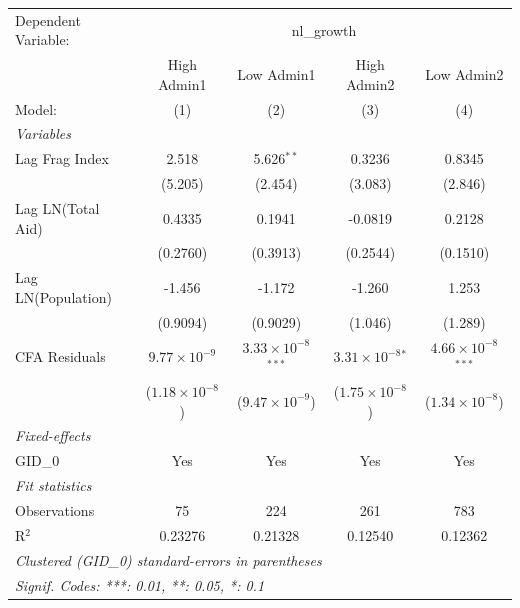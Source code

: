
\begingroup
\centering
\begin{tabular}{lcccc}
   \tabularnewline \midrule \midrule
   Dependent Variable: & \multicolumn{4}{c}{nl\_growth}\\
                      & High Admin1             & Low Admin1                    & High Admin2                 & Low Admin2 \\   
   Model:             & (1)                     & (2)                           & (3)                         & (4)\\  
   \midrule
   \emph{Variables}\\
   Lag Frag Index     & 2.518                   & 5.626$^{**}$                  & 0.3236                      & 0.8345\\   
                      & (5.205)                 & (2.454)                       & (3.083)                     & (2.846)\\   
   Lag LN(Total Aid)  & 0.4335                  & 0.1941                        & -0.0819                     & 0.2128\\   
                      & (0.2760)                & (0.3913)                      & (0.2544)                    & (0.1510)\\   
   Lag LN(Population) & -1.456                  & -1.172                        & -1.260                      & 1.253\\   
                      & (0.9094)                & (0.9029)                      & (1.046)                     & (1.289)\\   
   CFA Residuals      & $9.77\times 10^{-9}$    & $3.33\times 10^{-8}$$^{***}$  & $3.31\times 10^{-8}$$^{*}$  & $4.66\times 10^{-8}$$^{***}$\\    
                      & ($1.18\times 10^{-8}$)  & ($9.47\times 10^{-9}$)        & ($1.75\times 10^{-8}$)      & ($1.34\times 10^{-8}$)\\    
   \midrule
   \emph{Fixed-effects}\\
   GID\_0             & Yes                     & Yes                           & Yes                         & Yes\\  
   \midrule
   \emph{Fit statistics}\\
   Observations       & 75                      & 224                           & 261                         & 783\\  
   R$^2$              & 0.23276                 & 0.21328                       & 0.12540                     & 0.12362\\  
   \midrule \midrule
   \multicolumn{5}{l}{\emph{Clustered (GID\_0) standard-errors in parentheses}}\\
   \multicolumn{5}{l}{\emph{Signif. Codes: ***: 0.01, **: 0.05, *: 0.1}}\\
\end{tabular}
\par\endgroup


